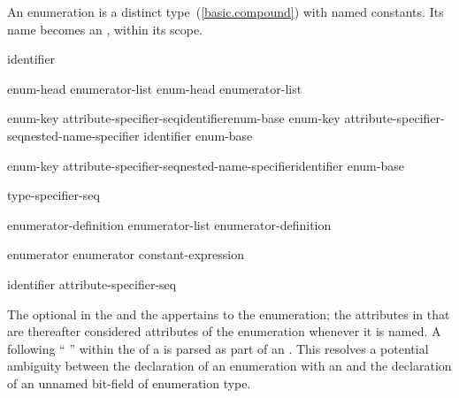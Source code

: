 \pnum
An enumeration is a distinct type~(\ref{basic.compound}) with named
constants. Its name becomes an , within its scope.

\begin{bnf}
\br
    identifier
\end{bnf}

\begin{bnf}
\br
    enum-head \terminal{\{} enumerator-list\opt{} \terminal{\}}\br
    enum-head \terminal{\{} enumerator-list \terminal{, \}}
\end{bnf}

\begin{bnf}
\br
    enum-key attribute-specifier-seq\opt identifier\opt enum-base\opt\br
    enum-key attribute-specifier-seq\opt nested-name-specifier identifier\br
\hspace*{\bnfindentinc}enum-base\opt
\end{bnf}

\begin{bnf}
\br
    enum-key attribute-specifier-seq\opt nested-name-specifier\opt identifier enum-base\opt{} \terminal{;}
\end{bnf}

\begin{bnf}
\br
    \br
    \br
\end{bnf}

\begin{bnf}
\br
    \terminal{:} type-specifier-seq
\end{bnf}

\begin{bnf}
\br
    enumerator-definition\br
    enumerator-list \terminal{,} enumerator-definition
\end{bnf}

\begin{bnf}
\br
    enumerator\br
    enumerator \terminal{=} constant-expression
\end{bnf}

\begin{bnf}
\br
    identifier attribute-specifier-seq\opt
\end{bnf}

The optional  in the  and
the  appertains to the enumeration; the attributes
in that  are thereafter considered attributes of the
enumeration whenever it is named.
A \tcode{:} following
``  ''
within the  of a 
is parsed as part of an .
\enternote This resolves a potential ambiguity between the declaration of an enumeration
with an  and the declaration of an unnamed bit-field of enumeration
type. \enterexample

